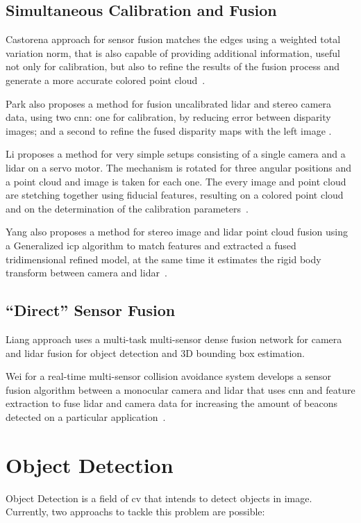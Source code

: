 \subsection{Simultaneous Calibration and Fusion}
Castorena \etal approach for sensor fusion matches the edges using a weighted total variation norm, that is also capable of providing additional information, useful not only for calibration, but also to refine the results of the fusion process and generate a more accurate colored point cloud~\cite{Castorena2016}.

Park \etal also proposes a method for fusion uncalibrated \ac{lidar} and stereo camera data, using two \ac{cnn}: one for calibration, by reducing error between disparity images; and a second to refine the fused disparity maps with the left image \cite{Park2019}. 

Li \etal proposes a method for very simple setups consisting of a single camera and a \ac{lidar} on a servo motor. The mechanism is rotated for three angular positions and a point cloud and image is taken for each one. The every image and point cloud are stetching together using fiducial features, resulting on a colored point cloud and on the determination of the calibration parameters~\cite{Li2016}. 

Yang \etal also proposes a method for stereo image and \ac{lidar} point cloud fusion using a Generalized \acl{icp} algorithm to match features and extracted a fused tridimensional refined model, at the same time it estimates the rigid body transform between camera and \ac{lidar}~\cite{Yang2017}.


\subsection{``Direct'' Sensor Fusion}
Liang \etal approach uses a multi-task multi-sensor dense fusion network for camera and \ac{lidar} fusion for object detection and 3D bounding box estimation.

Wei \etal for a real-time multi-sensor collision avoidance system develops a sensor fusion algorithm between a monocular camera and \ac{lidar} that uses \ac{cnn} and feature extraction to fuse \ac{lidar} and camera data for increasing the amount of beacons detected on a particular application~\cite{Wei2018}.


\section{Object Detection}
Object Detection is a field of \acl{cv} that intends to detect objects in image. Currently, two approachs to tackle this problem are possible:

